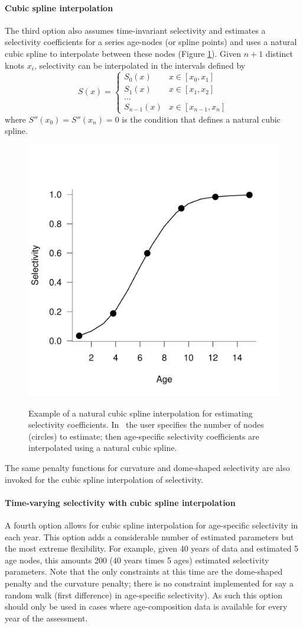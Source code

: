 \paragraph{Cubic spline interpolation}
The third option also assumes time-invariant selectivity and estimates a selectivity coefficients for a series age-nodes (or spline points) and uses a natural cubic spline to interpolate between these nodes (Figure \ref{Fig2}). Given $n+1$ distinct knots $x_i$, selectivity can be interpolated in the intervals defined by
\[
S(x) = \begin{cases}
	S_0(x) & x \in [x_0,x_1]\\
	S_1(x) & x \in [x_1,x_2]\\
	...\\
	S_{n-1}(x) & x \in [x_{n-1},x_n]
\end{cases}
\]
where  $S''(x_0) = S''(x_n)=0$  is the condition that defines a natural cubic spline.
\begin{figure}
	\centering
	\includegraphics[width=0.4\columnwidth]{../Figs/SplineEg.pdf}\\
	\caption{Example of a natural cubic spline interpolation for estimating selectivity coefficients.  In \iscam\ the user specifies the number of nodes (circles) to estimate; then age-specific selectivity coefficients are interpolated using a natural cubic spline.}\label{Fig2}
\end{figure}

The same penalty functions for curvature and dome-shaped selectivity are also invoked for the cubic spline interpolation of selectivity.

\paragraph{Time-varying selectivity with cubic spline interpolation} A fourth option allows for cubic spline interpolation for age-specific selectivity  in each year.  This option adds a considerable number of estimated parameters but the most extreme flexibility.  For example, given 40 years of data and estimated 5 age nodes, this amounts 200 (40 years times 5 ages) estimated selectivity parameters.  Note that the only constraints at this time are the dome-shaped penalty and the curvature penalty; there is no constraint implemented for say a random walk (first difference) in age-specific selectivity).  As such this option should only be used in cases where age-composition data is available for every year of the assessment.

